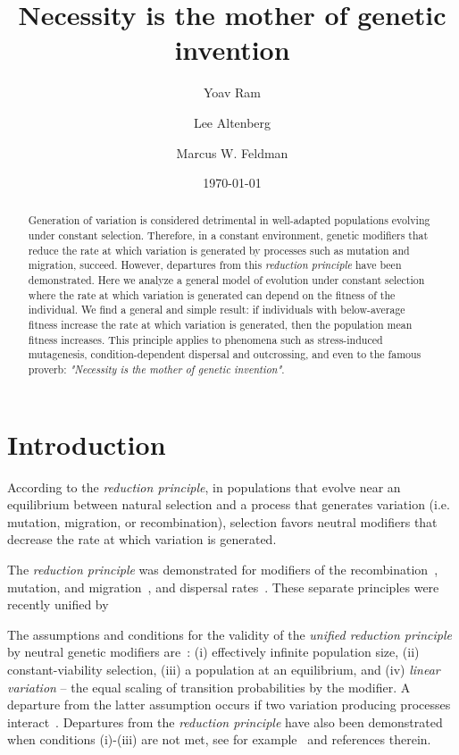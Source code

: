 \documentclass[9pt, a4paper, twocolumn]{extarticle}
\title{Necessity is the mother of genetic invention}
\author[a]{Yoav Ram}
\author[b]{Lee Altenberg}
\author[a]{Marcus W. Feldman}
\affil[a]{Department of Biology, Stanford University, Stanford, CA}
\affil[b]{Information and Computer Sciences, University of Hawai`i at M{\=a}noa, Honolulu, HI}
\date{\today}
\begin{document}
\maketitle

\begin{abstract}
Generation of variation is considered detrimental in well-adapted populations evolving under constant selection.
Therefore, in a constant environment, genetic modifiers that reduce the rate at which variation is generated by processes such as mutation and migration, succeed.
However, departures from this \emph{reduction principle} have been demonstrated.
Here we analyze a general model of evolution under constant selection where the rate at which variation is generated can depend on the fitness of the individual.
We find a general and simple result:
if individuals with below-average fitness increase the rate at which variation is generated, then the population mean fitness increases.
This principle applies to phenomena such as stress-induced mutagenesis, condition-dependent dispersal and outcrossing,
and even to the famous proverb: \emph{"Necessity is the mother of genetic invention"}.
\end{abstract}

\section*{Introduction}

According to the \emph{reduction principle}, in populations that evolve near an equilibrium between natural selection and a process that generates variation (i.e. mutation, migration, or recombination), selection favors neutral modifiers that decrease the rate at which variation is generated. 

The \emph{reduction principle} was demonstrated for modifiers of the recombination~\citep{Feldman1972}, mutation, and migration~\citep{Liberman1986a}, and dispersal rates~\citep{Altenberg1987}.
These separate principles were recently unified by~\citet{Altenberg2017}

The assumptions and conditions for the validity of the \emph{unified reduction principle} by neutral genetic modifiers are~\citep{Altenberg2017}:
(i) effectively infinite population size, (ii) constant-viability selection, (iii) a population at an equilibrium, and (iv) \emph{linear variation} -- the equal scaling of transition probabilities by the modifier.
A departure from the latter assumption occurs if two variation producing processes interact~\citep{Feldman1980,Altenberg2012}.
Departures from the \emph{reduction principle} have also been demonstrated when conditions (i)-(iii) are not met, see for example~\citet{Holsinger1986} and references therein.
\end{document}
